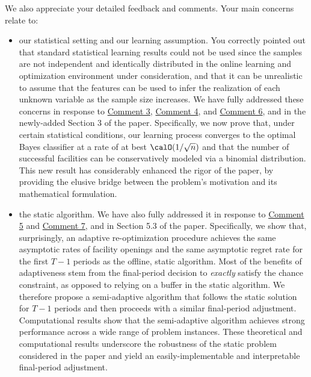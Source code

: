 \documentclass[11pt]{article}
\begin{document}
We also appreciate your detailed feedback and comments. Your main concerns relate to:
\begin{itemize}
    \item[--] our statistical setting and our learning assumption. You correctly pointed out that standard statistical learning results could not be used since the samples are not independent and identically distributed in the online learning and optimization environment under consideration, and that it can be unrealistic to assume that the features can be used to infer the realization of each unknown variable as the sample size increases. We have fully addressed these concerns in response to \hyperref[R2:3]{\color{blue}Comment 3}, \hyperref[R2:4]{\color{blue}Comment 4}, and \hyperref[R2:6]{\color{blue}Comment 6}, and in the newly-added Section 3 of the paper. Specifically, we now prove that, under certain statistical conditions, our learning process converges to the optimal Bayes classifier at a rate of at best $\calO(1/\sqrt{n})$ and that the number of successful facilities can be conservatively modeled via a binomial distribution. This new result has considerably enhanced the rigor of the paper, by providing the elusive bridge between the problem's motivation and its mathematical formulation.
    \item[--] the static algorithm. We have also fully addressed it in response to \hyperref[R2:5]{\color{blue}Comment 5} and \hyperref[R2:7]{\color{blue}Comment 7}, and in Section 5.3 of the paper. Specifically, we show that, surprisingly, an adaptive re-optimization procedure achieves the same asymptotic rates of facility openings and the same asymptotic regret rate for the first $T-1$ periods  as the offline, static algorithm. Most of the benefits of adaptiveness stem from the final-period decision to \textit{exactly} satisfy the chance constraint, as opposed to relying on a buffer in the static algorithm. We therefore propose a semi-adaptive algorithm that follows the static solution for $T-1$ periods and then proceeds with a similar final-period adjustment. Computational results show that the semi-adaptive algorithm achieves strong performance across a wide range of problem instances. These theoretical and computational results underscore the robustness of the static problem considered in the paper and yield an easily-implementable and interpretable final-period adjustment.
\end{itemize}
\end{document}
